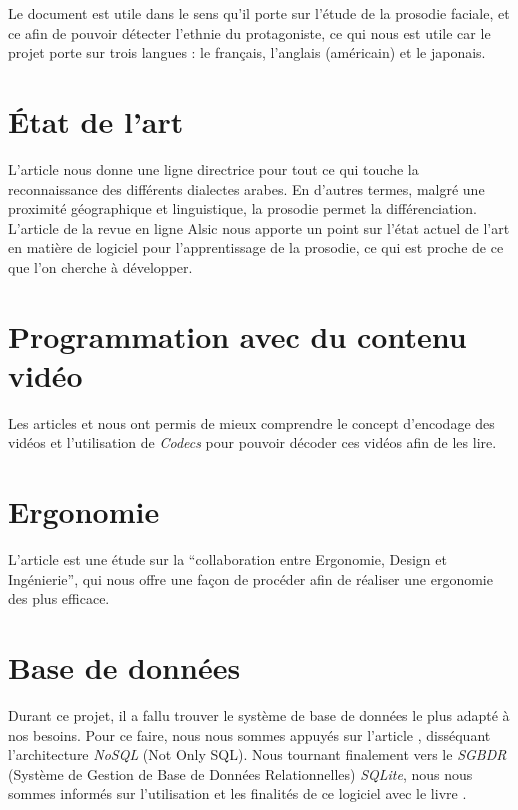 Le document \cite{matsumoto1992american} est utile dans le sens qu'il porte sur l'étude de la prosodie faciale, et ce afin de pouvoir détecter l'ethnie du protagoniste, ce qui nous est utile car le projet porte sur trois langues : le français, l'anglais (américain) et le japonais.


\section{État de l'art}\label{state_of_the_art}

L'article \cite{rouas2006identification} nous donne une ligne directrice pour tout ce qui touche la reconnaissance des différents dialectes arabes. En d'autres termes, malgré une proximité géographique et linguistique, la prosodie permet la différenciation.
L'article de la revue en ligne Alsic \cite{10.4000/alsic.332} nous apporte un point sur l'état actuel de l'art en matière de logiciel pour l'apprentissage de la prosodie, ce qui est proche de ce que l'on cherche à développer.

\section{Programmation avec du contenu vidéo}

Les articles \cite{ghanbari1999video} et \cite{he2013introduction} nous ont permis de mieux comprendre le concept d'encodage des vidéos et l'utilisation de \textit{Codecs} pour pouvoir décoder ces vidéos afin de les lire.

\section{Ergonomie}

L'article \cite{lente2014scenariser} est une étude sur la “collaboration entre Ergonomie, Design et Ingénierie”, qui nous offre une façon de procéder afin de réaliser une ergonomie des plus efficace.

\section{Base de données}

Durant ce projet, il a fallu trouver le système de base de données le plus adapté à nos besoins. Pour ce faire, nous nous sommes appuyés sur l'article \cite{strauchnosql}, disséquant l'architecture \textit{NoSQL} (Not Only SQL).
Nous tournant finalement vers le \textit{SGBDR} (Système de Gestion de Base de Données Relationnelles) \textit{SQLite}, nous nous sommes informés sur l'utilisation et les finalités de ce logiciel avec le livre \cite{kreibich2010using}.

